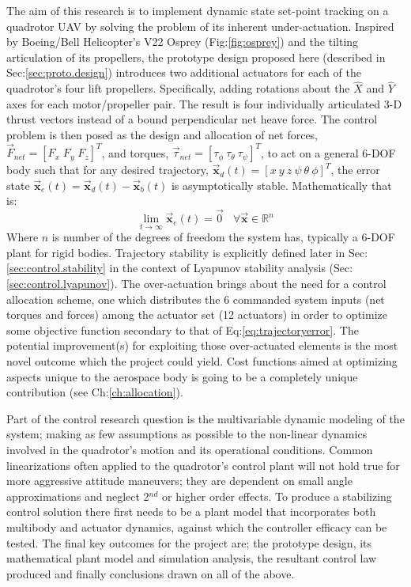 The aim of this research is to implement dynamic state set-point tracking on a quadrotor UAV by solving the problem of its inherent under-actuation. Inspired by Boeing/Bell Helicopter's V22 Osprey (Fig:\ref{fig:osprey}) and the tilting articulation of its propellers, the prototype design proposed here (described in Sec:\ref{sec:proto.design}) introduces two additional actuators for each of the quadrotor's four lift propellers. Specifically, adding rotations about the $\hat{X}$ and $\hat{Y}$ axes for each motor/propeller pair. The result is four individually articulated 3-D thrust vectors instead of a bound perpendicular net heave force. The control problem is then posed as the design and allocation of net forces, $\vec{F}_{net} = [F_x\;F_y\;F_z]^T$, and torques, $\vec{\tau}_{net} = [\tau_{\phi}~\tau_{\theta}~\tau_{\psi}]^T$, to act on a general 6-DOF body such that for any desired trajectory, $\vec{\mathbf{x}}_d(t)=[x~y~z~\psi~\theta~\phi]^T$, the error state $\vec{\mathbf{x}}_e(t) = \vec{\mathbf{x}}_d(t) - \vec{\mathbf{x}}_b(t)$ is asymptotically stable. Mathematically that is:
\begin{equation} \label{eq:trajectoryerror}
\lim_{t \rightarrow \infty} \vec{\mathbf{x}}_e(t) = \vec{0}~~~~\forall \vec{\mathbf{x}} \in \mathbb{R}^n
\end{equation}
Where $n$ is number of the degrees of freedom the system has, typically a 6-DOF plant for rigid bodies. Trajectory stability is explicitly defined later in Sec:\ref{sec:control.stability} in the context of Lyapunov stability analysis (Sec:\ref{sec:control.lyapunov}). The over-actuation brings about the need for a control allocation scheme, one which distributes the 6 commanded system inputs (net torques and forces) among the actuator set (12 actuators) in order to optimize some objective function secondary to that of Eq:\ref{eq:trajectoryerror}. The potential improvement(s) for exploiting those over-actuated elements is the most novel outcome which the project could yield. Cost functions aimed at optimizing aspects unique to the aerospace body is going to be a completely unique contribution (see Ch:\ref{ch:allocation}).
\par
Part of the control research question is the multivariable dynamic modeling of the system; making as few assumptions as possible to the non-linear dynamics involved in the quadrotor's motion and its operational conditions. Common linearizations often applied to the quadrotor's control plant will not hold true for more aggressive attitude maneuvers; they are dependent on small angle approximations and neglect 2$^{nd}$ or higher order effects. To produce a stabilizing control solution there first needs to be a plant model that incorporates both multibody and actuator dynamics, against which the controller efficacy can be tested. The final key outcomes for the project are; the prototype design, its mathematical plant model and simulation analysis, the resultant control law produced and finally conclusions drawn on all of the above.

